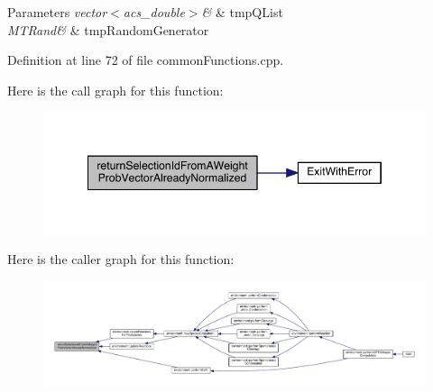 \begin{DoxyParams}{Parameters}
{\em vector$<$acs\-\_\-double$>$\&} & tmp\-Q\-List \\
\hline
{\em M\-T\-Rand\&} & tmp\-Random\-Generator \\
\hline
\end{DoxyParams}


Definition at line 72 of file common\-Functions.\-cpp.



Here is the call graph for this function\-:\nopagebreak
\begin{figure}[H]
\begin{center}
\leavevmode
\includegraphics[width=346pt]{a00075_a4135ff15fd24eb8fbfee3d00e1cfbf20_cgraph}
\end{center}
\end{figure}




Here is the caller graph for this function\-:\nopagebreak
\begin{figure}[H]
\begin{center}
\leavevmode
\includegraphics[width=350pt]{a00075_a4135ff15fd24eb8fbfee3d00e1cfbf20_icgraph}
\end{center}
\end{figure}


